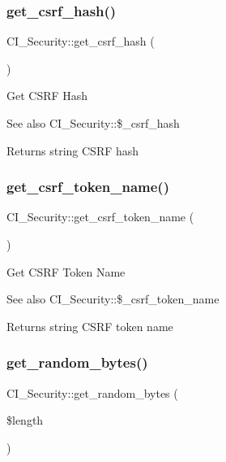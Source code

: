 \subsubsection{\texorpdfstring{get\+\_\+csrf\+\_\+hash()}{get\_csrf\_hash()}}
{\footnotesize\ttfamily C\+I\+\_\+\+Security\+::get\+\_\+csrf\+\_\+hash (\begin{DoxyParamCaption}{ }\end{DoxyParamCaption})}

Get C\+S\+RF Hash

\begin{DoxySeeAlso}{See also}
C\+I\+\_\+\+Security\+::\$\+\_\+csrf\+\_\+hash 
\end{DoxySeeAlso}
\begin{DoxyReturn}{Returns}
string C\+S\+RF hash 
\end{DoxyReturn}
\mbox{\label{class_c_i___security_a0b40fe053f68a41ed01fca61fc556c37}} 
\subsubsection{\texorpdfstring{get\+\_\+csrf\+\_\+token\+\_\+name()}{get\_csrf\_token\_name()}}
{\footnotesize\ttfamily C\+I\+\_\+\+Security\+::get\+\_\+csrf\+\_\+token\+\_\+name (\begin{DoxyParamCaption}{ }\end{DoxyParamCaption})}

Get C\+S\+RF Token Name

\begin{DoxySeeAlso}{See also}
C\+I\+\_\+\+Security\+::\$\+\_\+csrf\+\_\+token\+\_\+name 
\end{DoxySeeAlso}
\begin{DoxyReturn}{Returns}
string C\+S\+RF token name 
\end{DoxyReturn}
\mbox{\label{class_c_i___security_ad651614f8414feb0fe424278b95474e5}} 
\subsubsection{\texorpdfstring{get\+\_\+random\+\_\+bytes()}{get\_random\_bytes()}}
{\footnotesize\ttfamily C\+I\+\_\+\+Security\+::get\+\_\+random\+\_\+bytes (\begin{DoxyParamCaption}\item[{}]{\$length }\end{DoxyParamCaption})}

